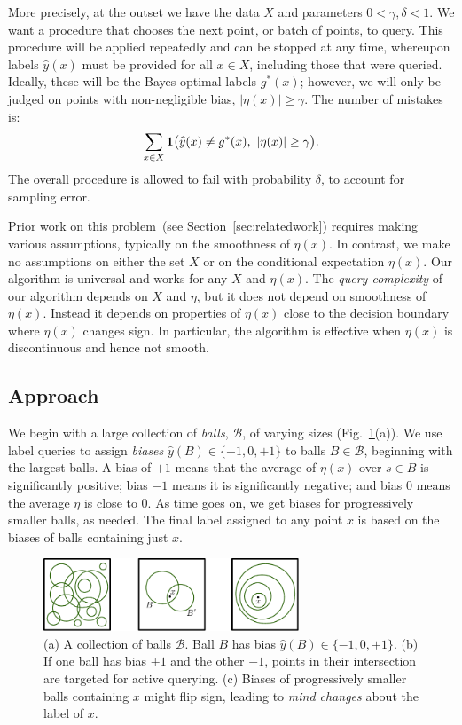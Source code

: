 \documentclass[twoside]{article}
\def\B{{\mathcal B}}
\def\yh{{\widehat{y}}}
\begin{document}
More precisely, at the outset we have the data $X$ and parameters
$0 < \gamma, \delta < 1$. We want a procedure that chooses the next
point, or batch of points, to query. This procedure will be applied
repeatedly and can be stopped at any time, whereupon labels $\yh(x)$
must be provided for all $x \in X$, including those that were
queried. Ideally, these will be the Bayes-optimal labels $g^*(x)$;
however, we will only be judged on points with non-negligible bias,
$|\eta(x)| \geq \gamma$. The number of mistakes is:
$$ \sum_{x \in X} {\bf 1} \big(\yh(x) \neq g^*(x),\ |\eta(x)| \geq \gamma \big) .$$
The overall procedure is allowed to fail with probability $\delta$, to account for sampling error.


Prior work on this problem~(see Section~\ref{sec:relatedwork})
requires making various assumptions, typically on the smoothness of
$\eta(x)$.  In contrast, we make no assumptions on either the set $X$
or on the conditional expectation $\eta(x)$. Our algorithm is
universal and works for any $X$ and $\eta(x)$. The {\em query
  complexity} of our algorithm depends on $X$ and $\eta$, but it does
not depend on smoothness of $\eta(x)$. Instead it depends on
properties of $\eta(x)$ close to the decision boundary where $\eta(x)$
changes sign. In particular, the algorithm is effective when $\eta(x)$
is discontinuous and hence not smooth.

\subsection{Approach}

We begin with a large collection of \emph{balls}, $\B$, of varying
sizes (Fig.~\ref{fig:challenges}(a)). We use label queries to assign
\emph{biases} $\yh(B) \in \{-1,0,+1\}$ to balls $B \in \B$, beginning
with the largest balls. A bias of $+1$ means that the average of 
$\eta(x)$ over $s \in B$ is significantly positive; bias $-1$ means it is
significantly negative; and bias $0$ means the average $\eta$ is close
to 0. As time goes on, we get biases for progressively smaller balls,
as needed. The final label assigned to any point $x$ is based on the
biases of balls containing just $x$.

\begin{figure}
\begin{center}
\includegraphics[width=3in]{figures/ideas.pdf}
\end{center}
\caption{(a) A collection of balls $\B$. Ball $B$ has bias $\yh(B) \in \{-1,0,+1\}$. (b) If one ball has bias $+1$ and the other $-1$, points in their intersection are targeted for active querying. (c) Biases of progressively smaller balls containing $x$ might flip sign, leading to \emph{mind changes} about the label of $x$.}
\label{fig:challenges}
\end{figure}
\end{document}
